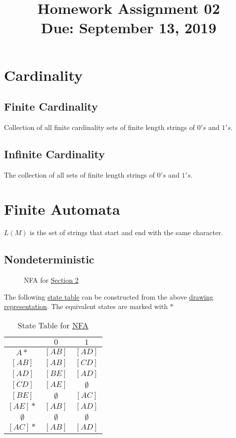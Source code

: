 \documentclass[11pt,letterpaper]{article}
\title{Homework Assignment 02 \\
    \small Due: September 13, 2019}
\begin{document}
\maketitle

\section{Cardinality}
\subsection{Finite Cardinality}
Collection of all finite cardinality sets of finite length strings of $0's$ and $1's$.

\subsection{Infinite Cardinality}
The collection of all sets of finite
length strings of $0's$ and $1's$.


\section{Finite Automata}
\label{sec:s2}
$L(M)$ is the set of strings that start and end with the same character.
\subsection{Nondeterministic}
\begin{figure}[!ht]
\centering
{}
\caption{NFA for \hyperref[sec:s2]{Section 2}}
\label{fig:nfa}
\end{figure}
The following \hyperref[tab:nfa]{state table} can be constructed from the above \hyperref[fig:nfa]{drawing representation}. The equivalent states are marked with $*$
\begin{table}[!ht]
\centering
\begin{tabular}{c| c c}
     & $0$ & $1$  \\
    \hline
    $A*$ & $[AB]$ & $[AD]$ \\
    $[AB]$ & $[AB]$ & $[CD]$ \\
    $[AD]$ & $[BE]$ & $[AD]$ \\
    $[CD]$ & $[AE]$ & $\emptyset$ \\
    $[BE]$ & $\emptyset$ & $[AC]$ \\
    $[AE]*$ & $[AB]$ & $[AD]$ \\
    $\emptyset$ & $\emptyset$ & $\emptyset$ \\
    $[AC]*$ & $[AB]$ & $[AD]$
\end{tabular}
\caption{State Table for \hyperref[fig:nfa]{NFA}}
\label{tab:nfa}
\end{table}
\end{document}
